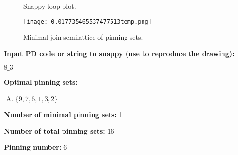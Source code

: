 \documentclass{article}%
\begin{document}
\begin{multicols}{2}
\begin{figure}[H]
\centering

\caption{Snappy loop plot.}
\label{fig:0.8238376966614136temp.svg}
\end{figure}\columnbreak

\begin{figure}[H]
\centering
\texttt{[image: 0.017735465537477513temp.png]}
\caption{Minimal join semilattice of pinning sets.}
\label{fig:0.017735465537477513temp.png}
\end{figure}\end{multicols}\newpage\begin{multicols}{2}

\columnbreak

\noindent\textbf{Input PD code or string to snappy (use to reproduce the drawing):}

	$8\_3$

\noindent\textbf{Optimal pinning sets:}

\begin{enumerate}[A)]
\item{\Huge\textcolor{green0}{\textbullet}}$\{9,7,6,1,3,2\}$

\end{enumerate}


\noindent\textbf{Number of minimal pinning sets:} 1

\noindent\textbf{Number of total pinning sets:} 16

\noindent\textbf{Pinning number:} 6


\end{multicols}
\end{document}
